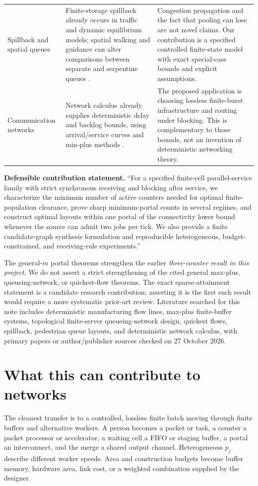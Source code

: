 \documentclass[11pt]{article}
\begin{document}
\begin{longtable}{>{\raggedright\arraybackslash}p{.23\linewidth}>{\raggedright\arraybackslash}p{.32\linewidth}>{\raggedright\arraybackslash}p{.37\linewidth}}
Spillback and spatial queues&Finite-storage spillback already occurs in traffic and dynamic equilibrium models; spatial walking and guidance can alter comparisons between separate and serpentine queues \cite{sering,yanagisawa}.&Congestion propagation and the fact that pooling can lose are not novel claims. Our contribution is a specified controlled finite-state model with exact special-case bounds and explicit assumptions.\\
Communication networks&Network calculus already supplies deterministic delay and backlog bounds, using arrival/service curves and min-plus methods \cite{netcal}.&The proposed application is choosing lossless finite-burst infrastructure and routing under blocking. This is complementary to those bounds, not an invention of deterministic networking theory.\\\bottomrule
\end{longtable}

\textbf{Defensible contribution statement.} ``For a specified finite-cell parallel-service family with strict synchronous receiving and blocking after service, we characterize the minimum number of active counters needed for optimal finite-population clearance, prove sharp minimum-portal counts in several regimes, and construct optimal layouts within one portal of the connectivity lower bound whenever the source can admit two jobs per tick. We also provide a finite candidate-graph synthesis formulation and reproducible heterogeneous, budget-constrained, and receiving-rule experiments.''

The general-$m$ portal theorems strengthen the earlier \emph{three-counter result in this project}. We do not assert a strict strengthening of the cited general max-plus, queueing-network, or quickest-flow theorems. The exact sparse-attainment statement is a candidate research contribution; asserting it is the first such result would require a more systematic prior-art review. Literature searched for this note includes deterministic manufacturing flow lines, max-plus finite-buffer systems, topological finite-server queueing-network design, quickest flows, spillback, pedestrian queue layouts, and deterministic network calculus, with primary papers or author/publisher sources checked on 27 October 2026.

\section{What this can contribute to networks}
The cleanest transfer is to a controlled, lossless finite batch moving through finite buffers and alternative workers. A person becomes a packet or task, a counter a packet processor or accelerator, a waiting cell a FIFO or staging buffer, a portal an interconnect, and the merge a shared output channel. Heterogeneous $p_j$ describe different worker speeds. Area and construction budgets become buffer memory, hardware area, link cost, or a weighted combination supplied by the designer.
\end{document}
